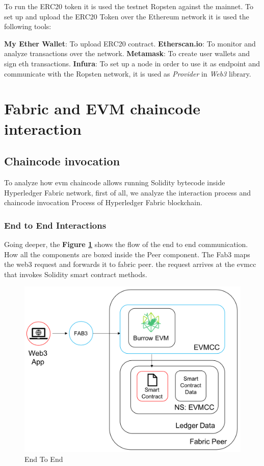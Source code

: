 To run the ERC20 token it is used the testnet Ropsten against the mainnet. 
To set up and upload the ERC20 Token over the Ethereum network it is used the following tools:

\begin{outline}
    \1 \textbf{My Ether Wallet}: To upload ERC20 contract.
    \1 \textbf{Etherscan.io}: To monitor and analyze transactions over the network.
    \1 \textbf{Metamask}: To create user wallets and sign eth transactions.
    \1 \textbf{Infura}: To set up a node in order to use it as endpoint and communicate with the Ropsten network,
    it is used as \textit{Provider} in \textit{Web3} library.  
\end{outline}

\section{Fabric and EVM chaincode interaction}

\subsection{Chaincode invocation}

To analyze how evm chaincode allows running Solidity bytecode inside Hyperledger Fabric network, first of all, we 
analyze the interaction process and chaincode invocation Process of Hyperledger Fabric blockchain. 

\subsubsection{End to End Interactions} 
Going deeper, the \textbf{Figure \ref{fig:end_to_end}} shows the flow of the end to end communication. How all the 
components are boxed inside the Peer component. The Fab3 maps the web3 request and forwards it to fabric peer. the request 
arrives at the evmcc that invokes Solidity smart contract methods.

\begin{figure}[h!]
    \centering
    \includegraphics[totalheight=7.5cm]{img/EndToEnd.png}
    \caption{End To End}
    \label{fig:end_to_end}
\end{figure}

